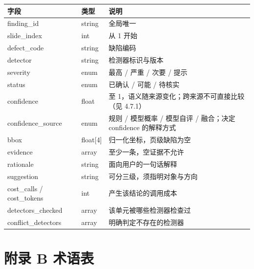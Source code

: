 \documentclass[
  11pt,
]{article}
\newcounter{none} %
\begin{document}
{\def\LTcaptype{none} %
\begin{longtable}[]{@{}
  >{\raggedright\arraybackslash}p{}
  >{\raggedright\arraybackslash}p{}
  >{\raggedright\arraybackslash}p{}@{}}
\toprule\noalign{}
\begin{minipage}[b]{\linewidth}\raggedright
字段
\end{minipage} & \begin{minipage}[b]{\linewidth}\raggedright
类型
\end{minipage} & \begin{minipage}[b]{\linewidth}\raggedright
说明
\end{minipage} \\
\midrule\noalign{}
\endhead
\bottomrule\noalign{}
\endlastfoot
finding\_id & string & 全局唯一 \\
slide\_index & int & 从 1 开始 \\
defect\_code & string & 缺陷编码 \\
detector & string & 检测器标识与版本 \\
severity & enum & 最高 / 严重 / 次要 / 提示 \\
status & enum & 已确认 / 可能 / 待核实 \\
confidence & float & 0 至 1，语义随来源变化；跨来源不可直接比较（见
4.7.1） \\
confidence\_source & enum & 规则 / 模型概率 / 模型自评 / 融合；决定
confidence 的解释方式 \\
bbox & float{[}4{]} & 归一化坐标，页级缺陷为空 \\
evidence & array & 至少一条，空证据不允许 \\
rationale & string & 面向用户的一句话解释 \\
suggestion & string & 可分三级，须指明对象与方向 \\
cost\_calls / cost\_tokens & int & 产生该结论的调用成本 \\
detectors\_checked & array & 该单元被哪些检测器检查过 \\
conflict\_detectors & array & 明确判定不存在的检测器 \\
\end{longtable}
}

\section{附录 B 术语表}\label{ux9644ux5f55-b-ux672fux8bedux8868}
\end{document}
